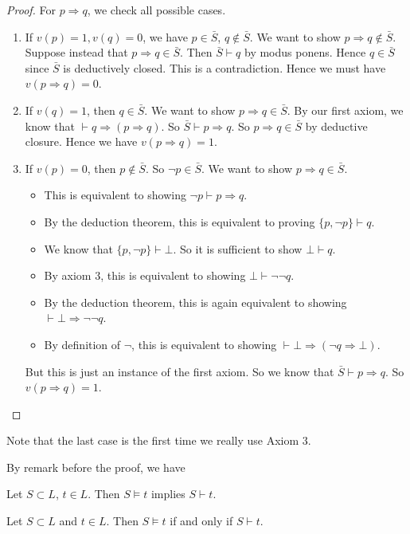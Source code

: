 \documentclass[a4paper]{article}
\begin{document}
\begin{proof}
  For $p\Rightarrow q$, we check all possible cases.
  \begin{enumerate}
    \item If $v(p) = 1, v(q) = 0$, we have $p\in \bar S$, $q\not\in \bar S$. We want to show $p\Rightarrow q\not\in \bar S$. Suppose instead that $p\Rightarrow q\in \bar S$. Then $\bar S \vdash q$ by modus ponens. Hence $q\in \bar S$ since $\bar S$ is deductively closed. This is a contradiction. Hence we must have $v(p\Rightarrow q) = 0$.
    \item If $v(q) = 1$, then $q\in \bar S$. We want to show $p\Rightarrow q\in \bar S$. By our first axiom, we know that $\vdash q\Rightarrow (p\Rightarrow q)$. So $\bar S \vdash p\Rightarrow q$. So $p\Rightarrow q \in \bar S$ by deductive closure. Hence we have $v(p \Rightarrow q) = 1$.
    \item If $v(p) = 0$, then $p\not\in \bar S$. So $\neg p\in \bar S$. We want to show $p\Rightarrow q\in \bar S$.
      \begin{itemize}
        \item
          This is equivalent to showing $\neg p \vdash p\Rightarrow q$.
        \item By the deduction theorem, this is equivalent to proving $\{p, \neg p\} \vdash q$.
        \item We know that $\{p, \neg p\} \vdash \bot$. So it is sufficient to show $\bot \vdash q$.
        \item By axiom 3, this is equivalent to showing $\bot \vdash \neg \neg q$.
        \item By the deduction theorem, this is again equivalent to showing $\vdash \bot \Rightarrow \neg \neg q$.
        \item By definition of $\neg$, this is equivalent to showing $\vdash \bot \Rightarrow (\neg q\Rightarrow \bot)$.
      \end{itemize}
      But this is just an instance of the first axiom. So we know that $\bar S\vdash p\Rightarrow q$. So $v(p\Rightarrow q) = 1$.\qedhere
  \end{enumerate}
\end{proof}
Note that the last case is the first time we really use Axiom 3.

By remark before the proof, we have
\begin{cor}
  Let $S\subset L$, $t\in L$. Then $S\models t$ implies $S\vdash t$.
\end{cor}

\begin{thm}
  Let $S\subset L$ and $t\in L$. Then $S\models t$ if and only if $S\vdash t$.
\end{thm}
\end{document}

